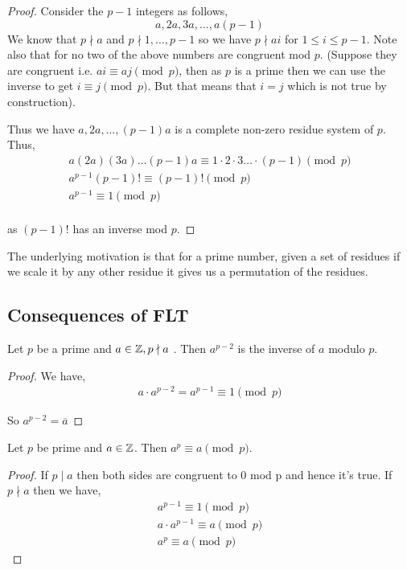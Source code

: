 \begin{proof}
Consider the $p - 1$ integers as follows, 
$$
	a,2a, 3a, \dots, a(p -1)
$$
We know that $p \nmid a$ and $p \nmid 1, \dots, p - 1$ so we have $p \nmid ai$ for $1 \le i \le p - 1$. Note also that for no two of the above numbers are congruent mod $p$. (Suppose they are congruent i.e. $ai \equiv aj \pmod p$, then as $p$ is a prime then we can use the inverse to get $i \equiv j \pmod p$. But that means that $i = j$ which is not true by construction).

\vspace{1em}

Thus we have $a, 2a, \dots, (p - 1)a$ is a complete non-zero residue system of $p$. Thus, 
\begin{align*}
	a(2a)(3a) \dots (p - 1)a \equiv 1 \cdot 2 \cdot 3 \dots \cdot (p - 1) \pmod p\\
	a^{p - 1} (p - 1)! \equiv (p - 1)! \pmod p\\
	a^{p - 1} \equiv 1 \pmod p\\
\end{align*}

as $(p - 1)!$ has an inverse mod $p$.

\end{proof}
\begin{remark}
	The underlying motivation is that for a prime number, given a set of residues if we scale it by any other residue it gives us a permutation of the residues.	
\end{remark}


	
\subsection{Consequences of FLT}

\begin{corollary}
	Let $p$ be a prime and $a \in \mathbb{Z}, p \nmid a$ . Then $a^{p - 2}$ is the inverse of $a$ modulo $p$.
\end{corollary}
\begin{proof}
	We have,
	\begin{align*}
		a \cdot a^{p - 2} = a^{p - 1} \equiv 1 \pmod p
	\end{align*}

	So $a^{p - 2} = \overline{a}$
\end{proof}

\begin{corollary}
	Let $p$ be prime and $a \in \mathbb{Z}$. Then $a^{p} \equiv a \pmod p$. 
\end{corollary}	
\begin{proof}
	If $p \mid a$ then both sides are congruent to 0 mod p and hence it's true. If $p \nmid a$ then we have,
	\begin{align*}
		a^{p  - 1} \equiv 1 \pmod p\\
		a \cdot a^{p  - 1} \equiv a \pmod p\\
 		a^{p} \equiv a \pmod p
	\end{align*}
\end{proof}

